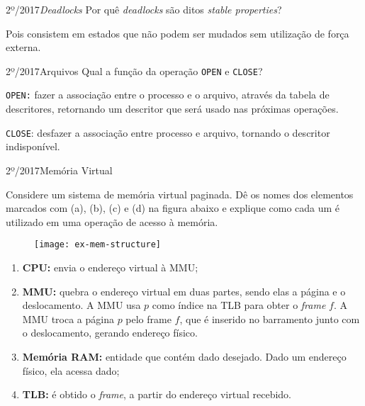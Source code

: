 \begin{exercicio}
  {2º/2017}{\textit{Deadlocks}}
  {Por quê \textit{deadlocks} são ditos \textit{stable properties}?}

  Pois consistem em estados que não podem ser mudados sem utilização de força externa.
\end{exercicio}

\begin{exercicio}
  {2º/2017}{Arquivos}
  {Qual a função da operação \texttt{OPEN} e \texttt{CLOSE}?}

  \texttt{OPEN:} fazer a associação entre o processo e o arquivo, através da tabela de descritores, retornando um descritor que será usado nas próximas operações.

  \texttt{CLOSE}: desfazer a associação entre processo e arquivo, tornando o descritor indisponível.
\end{exercicio}

\begin{exercicio}
  {2º/2017}{Memória Virtual}
  {
    Considere um sistema de memória virtual paginada. Dê os nomes dos elementos marcados com (a), (b), (c) e (d) na figura abaixo e explique como cada um é utilizado em uma operação de acesso à memória.
    \begin{figure}[!H]
      \centering
      \texttt{[image: ex-mem-structure]}
    \end{figure}
  }

  \begin{enumerate}[label=(\alph*)]
    \item \textbf{CPU:} envia o endereço virtual à MMU;

    \item \textbf{MMU:} quebra o endereço virtual em duas partes, sendo elas a página e o deslocamento. A MMU usa $p$ como índice na TLB para obter o \textit{frame} $f$. A MMU troca a página $p$ pelo frame $f$, que é inserido no barramento junto com o deslocamento, gerando endereço físico.

    \item \textbf{Memória RAM:} entidade que contém dado desejado. Dado um endereço físico, ela acessa dado;

    \item \textbf{TLB:} é obtido o \textit{frame}, a partir do endereço virtual recebido.
  \end{enumerate}
\end{exercicio}


